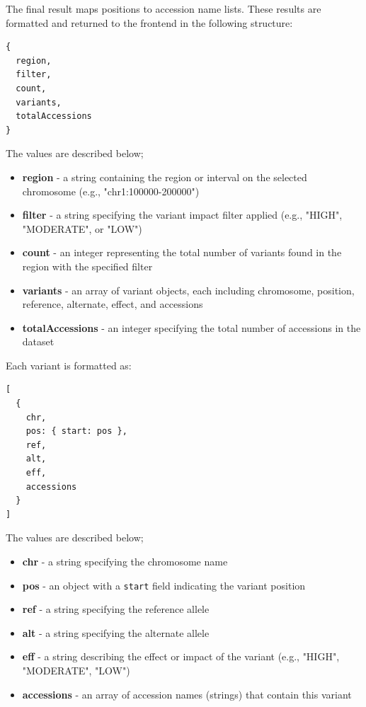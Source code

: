 \documentclass[12pt]{article}
\begin{document}
The final result maps positions to accession name lists. These results are formatted and returned to the frontend in the following structure:

\begin{verbatim}
{
  region,
  filter,
  count,
  variants,
  totalAccessions
}
\end{verbatim}

The values are described below;

\begin{itemize}
    \item \textbf{region} - a string containing the region or interval on the selected chromosome (e.g., "chr1:100000-200000")
    \item \textbf{filter} - a string specifying the variant impact filter applied (e.g., "HIGH", "MODERATE", or "LOW")
    \item \textbf{count} - an integer representing the total number of variants found in the region with the specified filter
    \item \textbf{variants} - an array of variant objects, each including chromosome, position, reference, alternate, effect, and accessions
    \item \textbf{totalAccessions} - an integer specifying the total number of accessions in the dataset
\end{itemize}

Each variant is formatted as:

\begin{verbatim}
[
  {
    chr,
    pos: { start: pos },
    ref,
    alt,
    eff,
    accessions
  }
]
\end{verbatim}

The values are described below;

\begin{itemize}
    \item \textbf{chr} - a string specifying the chromosome name
    \item \textbf{pos} - an object with a \texttt{start} field indicating the variant position
    \item \textbf{ref} - a string specifying the reference allele
    \item \textbf{alt} - a string specifying the alternate allele
    \item \textbf{eff} - a string describing the effect or impact of the variant (e.g., "HIGH", "MODERATE", "LOW")
    \item \textbf{accessions} - an array of accession names (strings) that contain this variant
\end{itemize}
\end{document}
